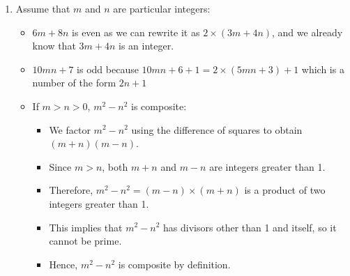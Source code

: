 \documentclass[a4paper, 10pt]{article}
\begin{document}
\begin{enumerate}
            \item Assume that \( m \) and \( n \) are particular integers:
            \begin{itemize}
                \item \( 6m + 8n \) is even as we can rewrite it as \( 2 \times (3m + 4n)\), and we already know that \(3m + 4n\) is an integer.
                \item \( 10mn + 7 \) is odd because \( 10mn + 6 + 1 = 2 \times (5mn + 3) + 1\) which is a number of the form \( 2n + 1\)
                \item If \( m > n > 0 \), \( m^2 - n^2 \) is composite:
                    \begin{itemize}
                        \item We factor \( m^2 - n^2 \) using the difference of squares to obtain \( (m + n)(m - n) \).
                        \item Since \( m > n \), both \( m + n \) and \( m - n \) are integers greater than 1.
                        \item Therefore, \( m^2 - n^2 = (m - n) \times (m + n)\) is a product of two integers greater than 1.
                        \item This implies that \( m^2 - n^2 \) has divisors other than 1 and itself, so it cannot be prime.
                        \item Hence, \( m^2 - n^2 \) is composite by definition.
                    \end{itemize}
            \end{itemize}
        \end{enumerate}
\end{document}
